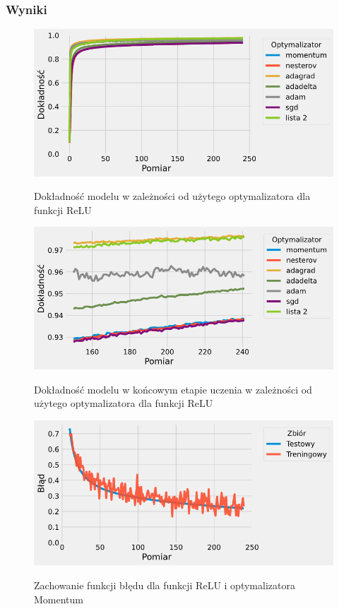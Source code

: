 \documentclass{article}
\begin{document}
\subsubsection*{Wyniki}
\begin{figure}[H]
	\centering
	\caption{Dokładność modelu w zależności od użytego optymalizatora dla funkcji ReLU}
	\includegraphics[width=\textwidth]{opt_relu_acc.png}
	\label{fig:res101}
\end{figure}
\begin{figure}[H]
	\centering
	\caption{Dokładność modelu w końcowym etapie uczenia w zależności od użytego optymalizatora dla funkcji ReLU}
	\includegraphics[width=\textwidth]{opt_relu_acc_zoom.png}
	\label{fig:res102}
\end{figure}
\begin{figure}[H]
	\centering
	\caption{Zachowanie funkcji błędu dla funkcji ReLU i optymalizatora Momentum}
	\includegraphics[width=\textwidth]{relu_mom_err.png}
	\label{fig:res103}
\end{figure}
\end{document}
